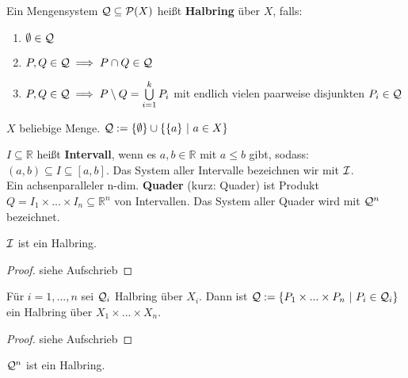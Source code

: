 \documentclass[11pt,a4paper,fleqn,openany]{report}
\begin{document}
    \begin{definition}
      Ein Mengensystem $\mathcal{Q} \subseteq \mathcal{P}(X)$ heißt \textbf{Halbring} über $X$, falls:
      \begin{enumerate}[label=\roman*)]
        \item $\emptyset \in \mathcal{Q}$
        \item $P, Q \in \mathcal{Q} \implies P \cap Q \in \mathcal{Q}$
        \item $P, Q \in \mathcal{Q} \implies P \setminus Q = \bigcup\limits_{i=1}^k P_i$ mit endlich vielen paarweise disjunkten $P_i \in \mathcal{Q}$
      \end{enumerate}
    \end{definition}

    \begin{example}
      $X$ beliebige Menge. $\mathcal{Q} := \{\emptyset\} \cup \{\{a\} \ | \ a \in X\}$
    \end{example}

    \begin{remark}
      $I \subseteq \mathbb{R}$ heißt \textbf{Intervall}, wenn es $a,b \in \mathbb{R}$ mit $a \leq b$ gibt, sodass: $(a,b) \subseteq I \subseteq [a,b]$. Das System aller Intervalle bezeichnen wir mit $\mathcal{I}$.\\
      Ein achsenparalleler n-dim. \textbf{Quader} (kurz: Quader) ist Produkt $Q = I_1 \times ... \times I_n \subseteq \mathbb{R}^n$ von Intervallen. Das System aller Quader wird mit $\mathcal{Q}^n$ bezeichnet.
    \end{remark}

    \begin{theorem}[i.A. II.19]
      $\mathcal{I}$ ist ein Halbring.
    \end{theorem}

    \begin{proof}
      siehe Aufschrieb
    \end{proof}

    \begin{theorem}[i.A. II.20]
      Für $i = 1, ..., n$ sei $\mathcal{Q}_i$ Halbring über $X_i$. Dann ist $\mathcal{Q}:=\{P_1 \times ... \times P_n \ | \ P_i \in \mathcal{Q}_i\}$ ein Halbring über $X_1 \times ... \times X_n$.
    \end{theorem}

    \begin{proof}
      siehe Aufschrieb
    \end{proof}

    \begin{theorem}[i.A. II.21]
      $\mathcal{Q}^n$ ist ein Halbring.
    \end{theorem}
\end{document}
